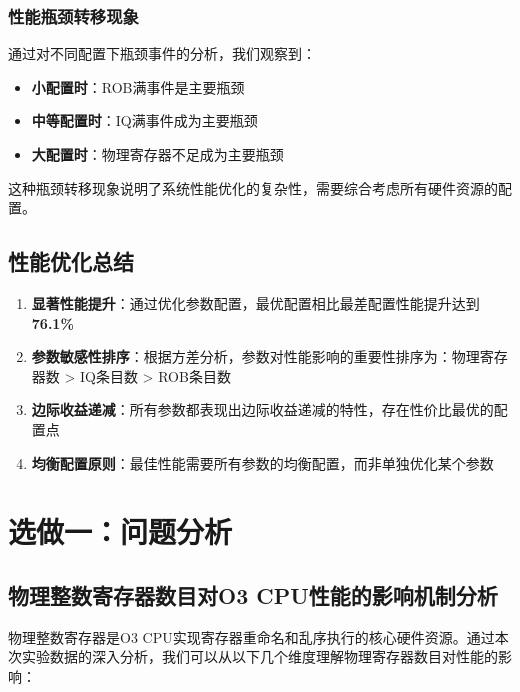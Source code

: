 \documentclass[a4paper]{article}
\begin{document}
\subsubsection{性能瓶颈转移现象}

通过对不同配置下瓶颈事件的分析，我们观察到：

\begin{itemize}
    \item \textbf{小配置时}：ROB满事件是主要瓶颈
    \item \textbf{中等配置时}：IQ满事件成为主要瓶颈
    \item \textbf{大配置时}：物理寄存器不足成为主要瓶颈
\end{itemize}

这种瓶颈转移现象说明了系统性能优化的复杂性，需要综合考虑所有硬件资源的配置。

\subsection{性能优化总结}

\begin{enumerate}
    \item \textbf{显著性能提升}：通过优化参数配置，最优配置相比最差配置性能提升达到\textbf{76.1\%}
    
    \item \textbf{参数敏感性排序}：根据方差分析，参数对性能影响的重要性排序为：物理寄存器数 > IQ条目数 > ROB条目数
    
    \item \textbf{边际收益递减}：所有参数都表现出边际收益递减的特性，存在性价比最优的配置点
    
    \item \textbf{均衡配置原则}：最佳性能需要所有参数的均衡配置，而非单独优化某个参数
\end{enumerate}

\section{选做一：问题分析}

\subsection{物理整数寄存器数目对O3 CPU性能的影响机制分析}

物理整数寄存器是O3 CPU实现寄存器重命名和乱序执行的核心硬件资源。通过本次实验数据的深入分析，我们可以从以下几个维度理解物理寄存器数目对性能的影响：
\end{document}
